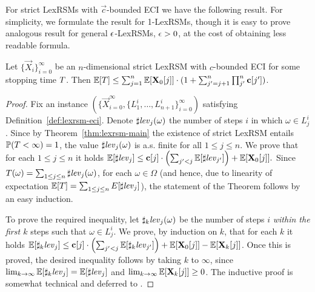 For strict LexRSMs with $\vec{c}$-bounded ECI we have the following result. For 
simplicity, 
we formulate the result for 1-LexRSMs, though it is easy to prove analogous 
result for general $\epsilon$-LexRSMs, $\epsilon>0$, at the cost of obtaining less 
readable formula.

\begin{theorem}
\label{thm:runtime-bound}
\label{THM:RUNTIME-BOUND}
Let $\{\vec{X}_{i}\}_{i=0}^{\infty}$ be an 
$n$-dimensional strict LexRSM with $c$-bounded ECI for some stopping time $T$. 
Then $\mathbb{E}[T]\leq  
\sum_{j=1}^{n}\mathbb{E}[\mathbf{X}_{0}[j]]\cdot(1+\sum_{j'= j+1}^{n}\prod_{j'}^{n} 
\mathbf{c}[j'])$.
\end{theorem}
\begin{proof}
Fix an instance $(\{\vec{X}_{i=0}^{\infty},\{L_1^i,\dots,L_{n+1}^i\}_{i=0}^{\infty})$ satisfying Definition~\ref{def:lexrsm-eci}. Denote $\sharp\mathit{lev}_j(\omega)$ the number of steps $i$ in which $\omega\in 
L_j^i$. Since by Theorem~\ref{thm:lexrsm-main} the existence of strict LexRSM entails 
$\mathbb{P}(T<\infty)=1$, the value $\sharp\mathit{lev}_j(\omega)$ is a.s. finite for all $1\leq j \leq n$. 
We prove that for each $1\leq j \leq n$ it holds $\mathbb{E}[\sharp\mathit{lev}_j]\leq 
\mathbf{c}[j]\cdot\left(\sum_{j'<j}\mathbb{E}[\sharp\mathit{lev}_{j'}]\right) + 
\mathbb{E}[\mathbf{X}_{0}[j]].$ Since $T(\omega)=\sum_{1\leq j \leq n} 
\sharp\mathit{lev}_j(\omega)$, for each $\omega\in \Omega$ (and hence, due to 
linearity of expectation $\mathbb{E}[T]=\sum_{1\leq j \leq n} 
E[\sharp\mathit{lev}_j]$), the statement of the 
Theorem follows by an easy induction. 

To prove the required inequality, let $\sharp_{k}\mathit{lev}_{j}(\omega)$ be the number 
of steps $i$ \emph{within the first $k$} steps such that $\omega\in L_j^i$. We 
prove, by induction on $k$, that for each $k$ it holds 
$\mathbb{E}[\sharp_{k}\mathit{lev}_{j}]\leq 
\mathbf{c}[j]\cdot\left(\sum_{j'<j}\mathbb{E}[\sharp_{k}\mathit{lev}_{j'}] \right)+ 
\mathbb{E}[\mathbf{X}_{0}[j]] - \mathbb{E}[\mathbf{X}_{k}[j]]$. Once this is proved, the 
desired inequality follows by taking $k$ to $\infty$, since 
$\lim_{k\rightarrow \infty}\mathbb{E}[\sharp_{k}\mathit{lev}_{j}] = \mathbb{E}[\sharp\mathit{lev}_j]$ and 
$\lim_{k\rightarrow \infty}\mathbb{E}[\mathbf{X}_{k}[j]] \geq 0$. The inductive proof is 
somewhat technical and deferred to \AppendixMaterial.


\end{proof}
